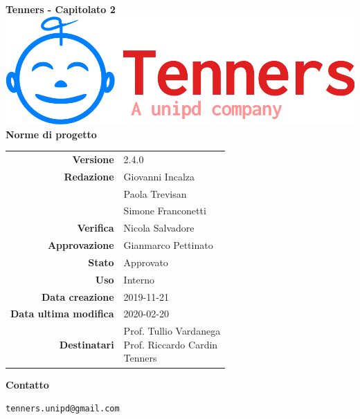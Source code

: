 \begin{titlepage}
	\begin{center}
		\large \textbf{Tenners - Capitolato 2}
		\vfill
		\includegraphics[scale = 0.3]{./res/img/logo.png}\\
		\vfill
		\Huge \textbf{Norme di progetto}

        \vfill
        \large

        \begin{tabular}{r|l}
                        \textbf{Versione} & 2.4.0 \\
                        \textbf{Redazione} &
                        Giovanni Incalza\\&
                        Paola Trevisan \\&
												Simone Franconetti\\
                        \textbf{Verifica} &
                        Nicola Salvadore \\
                        \textbf{Approvazione} & Gianmarco Pettinato\\
                        \textbf{Stato} & Approvato \\
                        \textbf{Uso} &  Interno\\
                        \textbf{Data creazione} &  2019-11-21\\
                        \textbf{Data ultima modifica} & 2020-02-20\\
                        \textbf{Destinatari} & \parbox[t]{5cm}{Prof. Tullio Vardanega\\Prof. Riccardo Cardin\\Tenners}
                \end{tabular}
                \vfill
                \normalsize
                \vfill
                \textbf{Contatto}

                \texttt{tenners.unipd@gmail.com}

	\end{center}
\end{titlepage}
